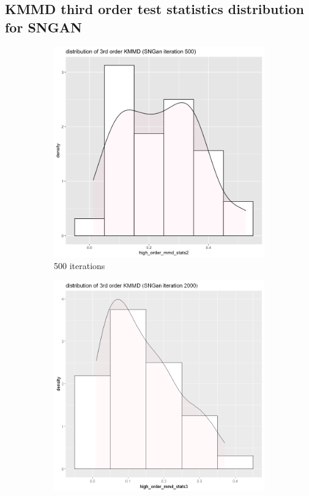 \documentclass{article}
\begin{document}
\subsection*{KMMD third order test statistics distribution for SNGAN}
\begin{figure}[h!]
    \caption{Dataset Flower}
     \centering
     \begin{subfigure}[b]{0.3\textwidth}
         \centering
         \includegraphics[width=\textwidth]{kmmd_figures/sngan_flower_highdist_500.png}
         \caption{500 iterations}
     \end{subfigure}
     \hfill
     \begin{subfigure}[b]{0.3\textwidth}
         \centering
         \includegraphics[width=\textwidth]{kmmd_figures/sngan_flower_highdist_2000.png}

\end{subfigure}
\end{figure}
\end{document}
